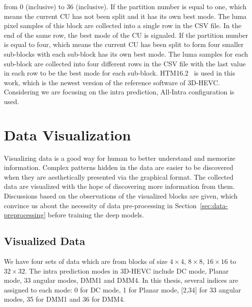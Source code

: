 from 0 (inclusive) to 36 (inclusive).
If the partition number is equal to one, which means the current CU has not
been split and it has its own best mode.
The luma pixel samples of this block are collected into a single row in the
CSV file.
In the end of the same row, the best mode of the CU is signaled.
If the partition number is equal to four, which means the current CU has been
split to form four smaller sub-blocks with each sub-block has its
own best mode.
The luma samples for each sub-block are collected into four different rows
in the CSV file with the last value in each row to be the best mode for each
sub-block.
HTM16.2~\parencite{RN214} is used in this work, which is the newest
version of the reference software of 3D-HEVC\@.
Considering we are focusing on the intra prediction,
All-Intra configuration is used.

\section{Data Visualization}\label{sec:data-visu}
Visualizing data is a good way for human to better understand
and memorize information. 
Complex patterns hidden in the data are easier to be discovered when they 
are aesthetically presented via the graphical format.
The collected data are visualized with the hope of
discovering more information from them.
Discussions based on the observations of the visualized blocks
are given, which convince us about the necessity of data 
pre-processing in Section~\ref{sec:data-preprocessing} before 
training the deep models.

\subsection{Visualized Data}\label{subsec:see-data-visu}
We have four sets of data which are from blocks of size
\(4\times4\), \(8\times8\), \(16\times16\) to \(32\times32\).
The intra prediction modes in 3D-HEVC include
DC mode, Planar mode, 33 angular modes, DMM1 and DMM4.
In this thesis, several indices are assigned to each mode:
0 for DC mode, 1 for Planar mode, {[2,34]} for 33 angular modes, 35
for DMM1 and 36 for DMM4.


